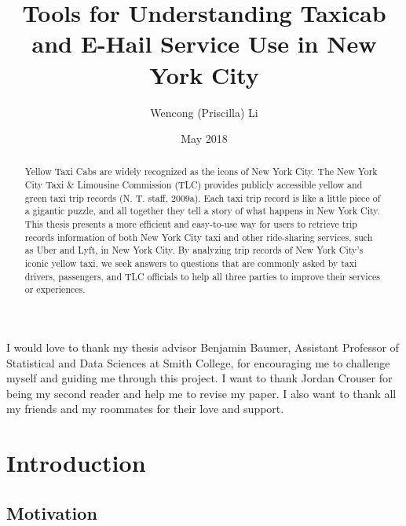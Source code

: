 \documentclass[12pt,twoside]{reedthesis}
\title{Tools for Understanding Taxicab and E-Hail Service Use in New York City}
\author{Wencong (Priscilla) Li}
\date{May 2018}
\theoremstyle{definition}
\theoremstyle{definition}
\theoremstyle{definition}
\theoremstyle{remark}
\begin{document}
  \maketitle

\frontmatter %
\pagestyle{empty} %
  \begin{acknowledgements}
    I would love to thank my thesis advisor Benjamin Baumer, Assistant
    Professor of Statistical and Data Sciences at Smith College, for
    encouraging me to challenge myself and guiding me through this project.
    I want to thank Jordan Crouser for being my second reader and help me to
    revise my paper. I also want to thank all my friends and my roommates
    for their love and support.
  \end{acknowledgements}

  \hypersetup{linkcolor=black}
  \setcounter{tocdepth}{2}
  \tableofcontents

  \listoftables

  \listoffigures
  \begin{abstract}
    Yellow Taxi Cabs are widely recognized as the icons of New York City.
    The New York City Taxi \& Limousine Commission (TLC) provides publicly
    accessible yellow and green taxi trip records (N. T. staff, 2009a). Each
    taxi trip record is like a little piece of a gigantic puzzle, and all
    together they tell a story of what happens in New York City. This thesis
    presents a more efficient and easy-to-use way for users to retrieve trip
    records information of both New York City taxi and other ride-sharing
    services, such as Uber and Lyft, in New York City. By analyzing trip
    records of New York City's iconic yellow taxi, we seek answers to
    questions that are commonly asked by taxi drivers, passengers, and TLC
    officials to help all three parties to improve their services or
    experiences.
  \end{abstract}

\mainmatter %
\pagestyle{fancyplain} %

\chapter{Introduction}\label{introduction}

\section{Motivation}\label{motivation}
\end{document}
